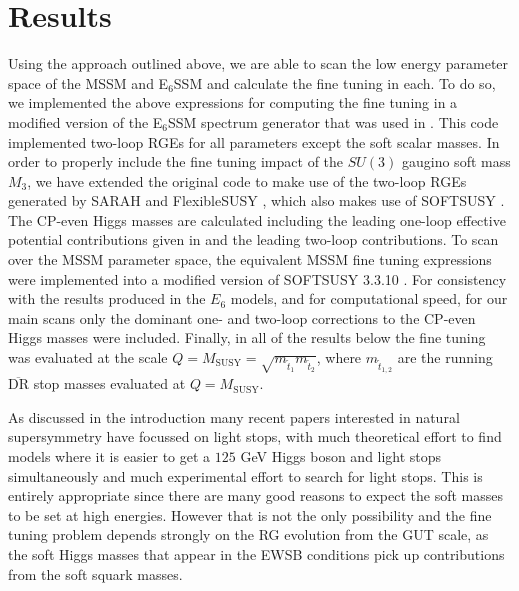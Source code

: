 \documentclass[preprint,amsmath,amssymb,aps,superscriptaddress,prd,
showpacs,floatfix,nofootinbib]{revtex4-1}
\begin{document}
\section{\label{sec:results}Results}

Using the approach outlined above, we are able to scan the low energy
parameter space of the MSSM and E$_6$SSM and calculate the fine tuning
in each.  To do so, we implemented the above expressions for computing
the fine tuning in a modified version of the E$_6$SSM spectrum
generator that was used in \cite{Athron:2013ipa}.  This code
implemented two-loop RGEs for all parameters except the soft scalar
masses.  In order to properly include the fine tuning impact of the
$SU(3)$ gaugino soft mass $M_3$, we have extended the original code to
make use of the two-loop RGEs generated by SARAH
\cite{Staub:2009bi, Staub:2010jh, Staub:2012pb, Staub:2013tta} and
FlexibleSUSY \cite{Athron:2014yba}, which also makes use of SOFTSUSY
\cite{Allanach:2001kg, Allanach:2013kza}.  The CP-even Higgs masses are
calculated including the leading one-loop effective potential
contributions given in \cite{Athron:2009bs} and the leading two-loop
contributions.  To scan over the MSSM parameter space, the equivalent
MSSM fine tuning expressions were implemented into a modified version
of SOFTSUSY 3.3.10 \cite{Allanach:2001kg}.  For consistency with the results
produced in the $E_6$ models, and for computational speed, for our main scans
only the dominant one- and two-loop corrections to the CP-even Higgs masses
were included.  Finally, in all of the results below the fine tuning was
evaluated at the scale $Q = M_{\textrm{SUSY}} =
\sqrt{m_{\tilde{t}_1}m_{\tilde{t}_2}}$, where $m_{\tilde{t}_{1,2}}$ are the
running $\overline{\textrm{DR}}$ stop masses evaluated at
$Q = M_{\textrm{SUSY}}$.

As discussed in the introduction many recent papers interested in
natural supersymmetry have focussed on light stops, with much
theoretical effort to find models where it is easier to get a $125$
GeV Higgs boson and light stops simultaneously and much experimental
effort to search for light stops.  This is entirely appropriate since
there are many good reasons to expect the soft masses to be set at
high energies.  However that is not the only possibility and the fine
tuning problem depends strongly on the RG evolution from the GUT
scale, as the soft Higgs masses that appear in the EWSB conditions
pick up contributions from the soft squark masses.
\end{document}
